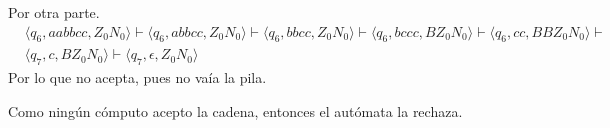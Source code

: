 \documentclass{article}
\begin{document}
\begin{enumerate}
{\begin{enumerate}
{\begin{itemize}
{				Por otra parte.
        		\begin{align*}
					&\langle q_6, aabbcc, Z_0N_0 \rangle \vdash 
					\langle q_6, abbcc, Z_0N_0 \rangle \vdash 
					\langle q_6, bbcc, Z_0N_0 \rangle \vdash 
					\langle q_6, bccc, BZ_0N_0 \rangle \vdash 
					\langle q_6, cc, BBZ_0N_0 \rangle \vdash \\
					&\langle q_7, c, BZ_0N_0 \rangle \vdash 
					\langle q_7, \epsilon, Z_0N_0 \rangle
				\end{align*}
				Por lo que no acepta, pues no vaía la pila.
        		
        		Como ningún cómputo acepto la cadena, entonces el autómata la rechaza.
        		}
        	\end{itemize}
        	}
        \end{enumerate}
    	}
    \end{enumerate}
\end{document}
